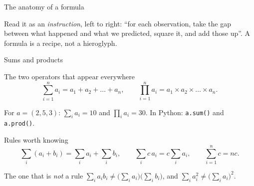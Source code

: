 \documentclass[aspectratio=169,11pt]{beamer}
\begin{document}
\begin{frame}{The anatomy of a formula}
  \begin{center}
  \end{center}
  \begin{takeaway}
    Read it as an \emph{instruction}, left to right: ``for each observation,
    take the gap between what happened and what we predicted, square it, and
    add those up''. A formula is a recipe, not a hieroglyph.
  \end{takeaway}
\end{frame}

\begin{frame}{Sums and products}\label{frm:sums}
  \footnotesize
  \begin{block}{The two operators that appear everywhere}
    \[
      \sum_{i=1}^{n} a_i = a_1 + a_2 + \dots + a_n,
      \qquad
      \prod_{i=1}^{n} a_i = a_1 \times a_2 \times \dots \times a_n .
    \]
  \end{block}
  \begin{numexample}
    For $a = (2, 5, 3)$: $\sum_i a_i = 10$ and $\prod_i a_i = 30$.
    In Python: \texttt{a.sum()} and \texttt{a.prod()}.
  \end{numexample}
  \begin{block}{Rules worth knowing}
    \[
      \sum_i (a_i + b_i) = \sum_i a_i + \sum_i b_i,
      \qquad
      \sum_i c\,a_i = c\sum_i a_i,
      \qquad
      \sum_{i=1}^{n} c = nc .
    \]
  \end{block}
  \begin{alertblock}{The one that is \emph{not} a rule}
    $\sum_i a_i b_i \ne \bigl(\sum_i a_i\bigr)\bigl(\sum_i b_i\bigr)$, and
    $\sum_i a_i^2 \ne \bigl(\sum_i a_i\bigr)^2$.
  \end{alertblock}
\end{frame}
\end{document}
